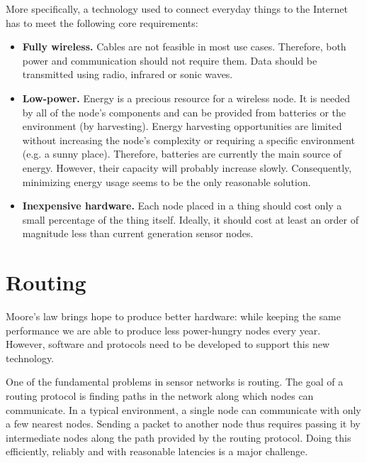 More specifically, a technology used to connect everyday things to the Internet has to meet the following core requirements:
\begin{itemize}
  \item \textbf{Fully wireless.} Cables are not feasible in most use cases. Therefore, both power and communication should not require them.
Data should be transmitted using radio, infrared or sonic waves.
  \item \textbf{Low-power.} Energy is a precious resource for a wireless node.
It is needed by all of the node's components and can be provided from batteries or the environment (by harvesting).
Energy harvesting opportunities are limited without increasing the node's complexity or requiring a specific environment (e.g. a sunny place).
Therefore, batteries are currently the main source of energy.
However, their capacity will probably increase slowly.
Consequently, minimizing energy usage seems to be the only reasonable solution.
  \item \textbf{Inexpensive hardware.} Each node placed in a thing should cost only a small percentage of the thing itself.
Ideally, it should cost at least an order of magnitude less than current generation sensor nodes.
\end{itemize}

\section{Routing}
Moore's law brings hope to produce better hardware: while keeping the same performance we are able to produce less power-hungry nodes every year.
However, software and protocols need to be developed to support this new technology.

One of the fundamental problems in sensor networks is routing.
The goal of a routing protocol is finding paths in the network along which nodes can communicate.
In a typical environment, a single node can communicate with only a few nearest nodes.
Sending a packet to another node thus requires passing it by intermediate nodes along the path provided by the routing protocol.
Doing this efficiently, reliably and with reasonable latencies is a major challenge.

